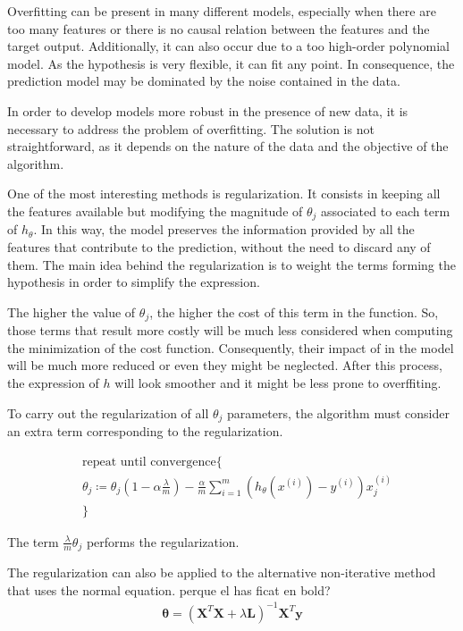 \documentclass[a4paper, report, oneside, UKenglish]{memoir}
\newcommand{\by}{\boldsymbol{y}}
\newcommand{\btheta}{\boldsymbol{\theta}}
\begin{document}
 Overfitting can be present in many different models, especially when there are too many features or there is no causal relation between the features and the target output. Additionally, it can also occur due to a too high-order polynomial model. As the hypothesis is very flexible, it can fit any point. In consequence, the prediction model may be dominated by the noise contained in the data.

In order to develop models more robust in the presence of new data, it is necessary to address the problem of overfitting. The solution is not straightforward, as it depends on the nature of the data and the objective of the algorithm. 

One of the most interesting methods is regularization. It consists in keeping all the features available but modifying the magnitude of $\theta_{j}$ associated to each term of $h_\theta$. In this way, the model preserves the information provided by all the features that contribute to the prediction, without the need to discard any of them. The main idea behind the regularization is to weight the terms forming the hypothesis in order to simplify the expression. 

The higher the value of $\theta_{j}$, the higher the cost of this term in the function. So, those terms that result more costly will be much less considered when computing the minimization of the cost function. Consequently, their impact of in the model will be much more reduced or even they might be neglected. After this process, the expression of $h$ will look smoother and it might be less prone to overffiting.

To carry out the regularization of all $\theta_{j}$ parameters, the algorithm must consider an extra term corresponding to the regularization.

\begin{equation}\label{eq:gdthetaRegul}
\begin{split}
    &\mbox{repeat until convergence}\{\\
    &\theta_{j} \coloneqq \theta_{j}(1 - \alpha\frac{\lambda}{m}) - \frac{\alpha}{m} \sum\limits_{i=1}^{m}(h_{\theta}(x^{(i)}) -  y^{(i)})x_{j}^{(i)}\\
&\}
\end{split}
\end{equation}

The term $\frac{\lambda}{m}\theta_{j}$ performs the regularization. 

The regularization can also be applied to the alternative non-iterative method that uses the normal equation.
perque el has ficat en bold?
\begin{equation}\label{eq:estimatorLSRegul}
\begin{split}
    \btheta = (\textbf{X}^{T}\textbf{X} + \lambda \textbf{L})^{-1}\textbf{X}^{T}\by\\
\end{split}
\end{equation}
\end{document}
